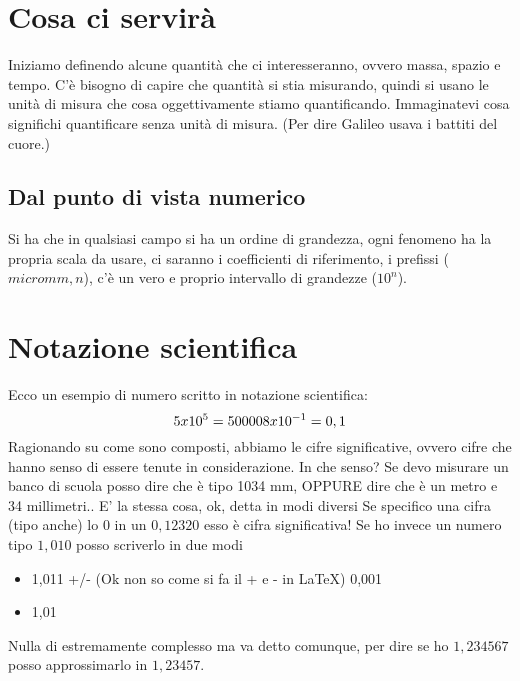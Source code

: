 \documentclass[12pt, a4paper, openany, oneside]{book}
\begin{document}
\section{Cosa ci servirà}
Iniziamo definendo alcune quantità che ci interesseranno, ovvero massa, spazio 
e tempo.
\newline \newline
C'è bisogno di capire che quantità si stia misurando, quindi si usano le unità 
di misura che cosa oggettivamente stiamo quantificando. Immaginatevi cosa 
significhi quantificare senza unità di misura. (Per dire Galileo usava i 
battiti del cuore.)
\newline \newline
\subsection{Dal punto di vista numerico}
Si ha che in qualsiasi campo si ha un ordine di grandezza, ogni fenomeno ha la
propria scala da usare, ci saranno i coefficienti di riferimento, i prefissi
($micro mm, n$), c'è un vero e proprio intervallo di grandezze ($10^{n}$).
\section{Notazione scientifica}
Ecco un esempio di numero scritto in notazione scientifica: 
\[
5 x 10^{5} = 50000 \newline
8 x 10^{-1} = 0,1 
\]
\newline \newline
Ragionando su come sono composti, abbiamo le cifre significative, ovvero cifre
che hanno senso di essere tenute in considerazione. In che senso? Se devo 
misurare un banco di scuola posso dire che è tipo 1034 mm, OPPURE dire che è un
metro e 34 millimetri.. E' la stessa cosa, ok, detta in modi diversi
\newline \newline
Se specifico una cifra (tipo anche) lo 0 in un $0,12320$ esso è cifra significativa!
\newline \newline
Se ho invece un numero tipo $1,010$ posso scriverlo in due modi
\begin{itemize}
	\item 1,011 +/- (Ok non so come si fa il + e - in \LaTeX) 0,001
	\item 1,01 
\end{itemize}
Nulla di estremamente complesso ma va detto comunque, per dire se ho $1,234567$
posso approssimarlo in $1,23457$. \newline \newline
\end{document}

